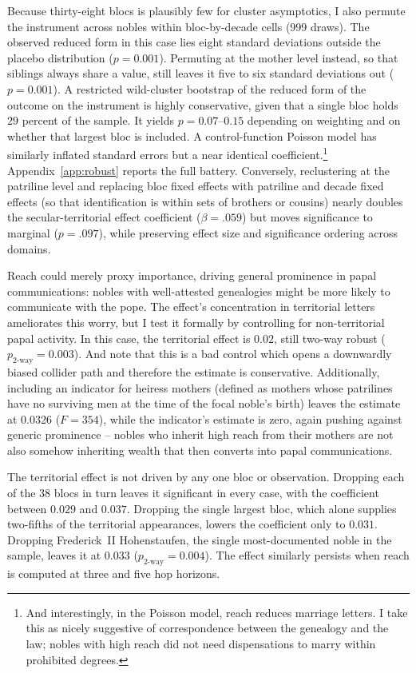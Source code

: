 \documentclass[12pt]{article}
\theoremstyle{definition}
\theoremstyle{remark}
\begin{document}
Because thirty-eight blocs is plausibly few for cluster asymptotics, I also permute the instrument across nobles within bloc-by-decade cells (999 draws). The observed reduced form in this case lies eight standard deviations outside the placebo distribution ($p=0.001$). Permuting at the mother level instead, so that siblings always share a value, still leaves it five to six standard deviations out ($p = 0.001$). A restricted wild-cluster bootstrap of the reduced form of the outcome on the instrument is highly conservative, given that a single bloc holds $29$ percent of the sample. It yields $p=0.07$--$0.15$ depending on weighting and on whether that largest bloc is included. A control-function Poisson model has similarly inflated standard errors but a near identical coefficient.\footnote{And interestingly, in the Poisson model, reach reduces marriage letters. I take this as nicely suggestive of correspondence between the genealogy and the law; nobles with high reach did not need dispensations to marry within prohibited degrees.} Appendix~\ref{app:robust} reports the full battery. Conversely, reclustering at the patriline level and replacing bloc fixed effects with patriline and decade fixed effects (so that identification is within sets of brothers or cousins) nearly doubles the secular-territorial effect coefficient ($\beta = .059$) but moves significance to marginal ($p = .097$), while preserving effect size and significance ordering across domains.

Reach could merely proxy importance, driving general prominence in papal communications: nobles with well-attested genealogies might be more likely to communicate with the pope. The effect's concentration in territorial letters ameliorates this worry, but I test it formally by controlling for non-territorial papal activity. In this case, the territorial effect is $0.02$, still two-way robust ($p_{\text{2-way}}=0.003$). And note that this is a bad control which opens a downwardly biased collider path and therefore the estimate is conservative. Additionally, including an indicator for heiress mothers (defined as mothers whose patrilines have no surviving men at the time of the focal noble's birth) leaves the estimate at 0.0326 ($F=354$), while the indicator's estimate is zero, again pushing against generic prominence -- nobles who inherit high reach from their mothers are not also somehow inheriting wealth that then converts into papal communications.

The territorial effect is not driven by any one bloc or observation. Dropping each of the $38$ blocs in turn leaves it significant in every case, with the coefficient between $0.029$ and $0.037$. Dropping the single largest bloc, which alone supplies two-fifths of the territorial appearances, lowers the coefficient only to $0.031$. Dropping Frederick~II Hohenstaufen, the single most-documented noble in the sample, leaves it at $0.033$ ($p_{\text{2-way}}=0.004$). The effect similarly persists when reach is computed at three and five hop horizons.
\end{document}
